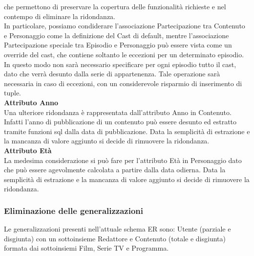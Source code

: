 \documentclass[a4paper]{article}
\begin{document}
che permettono di preservare la copertura delle funzionalità richieste e nel contempo di eliminare la ridondanza. \\
In particolare, possiamo condiderare l'associazione Partecipazione tra Contenuto e Personaggio come 
la definizione del Cast di default, mentre l'associazione Partecipazione speciale tra Episodio e Personaggio 
può essere vista come un override del cast, che contiene soltanto le eccezioni per un determinato episodio. \\
In questo modo non sarà necessario specificare per ogni episodio tutto il cast, dato che verrà desunto dalla serie di appartenenza.
Tale operazione sarà necessaria in caso di eccezioni, con un considerevole risparmio di inserimento di tuple. \\
\textbf{Attributo Anno}\\
Una ulteriore ridondanza è rappresentata dall'attributo Anno in Contenuto. Infatti l'anno di pubblicazione 
di un contenuto può essere desunto ed estratto tramite funzioni sql dalla data di pubblicazione.
Data la semplicità di estrazione e la mancanza di valore aggiunto si decide di rimuovere la ridondanza. \\
\textbf{Attributo Età}\\
La medesima considerazione si può fare per l'attributo Età in Personaggio dato che può essere agevolmente calcolata
a partire dalla data odierna.
Data la semplicità di estrazione e la mancanza di valore aggiunto si decide di rimuovere la ridondanza. \\

\subsubsection{Eliminazione delle generalizzazioni}
Le generalizzazioni presenti nell'attuale schema ER sono: Utente (parziale e disgiunta) con un sottoinsieme Redattore e 
Contenuto (totale e disgiunta) formata dai sottoinsiemi Film, Serie TV e Programma.\\
\end{document}
